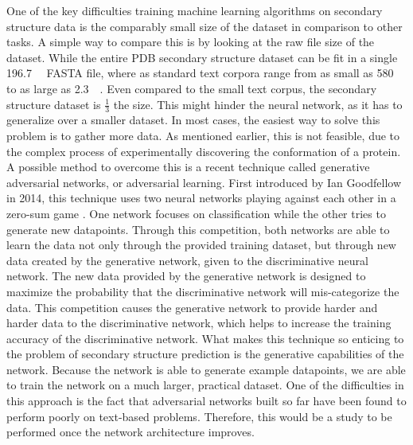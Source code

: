\documentclass[pageno]{jpaper}
\begin{document}
\par
One of the key difficulties training machine learning algorithms on secondary structure data is the comparably small size of the dataset in comparison to other tasks.  A simple way to compare this is by looking at the raw file size of the dataset.  While the entire PDB secondary structure dataset can be fit in a single \SI{196.7}{\mega\byte} FASTA file, where as standard text corpora range from as small as \SI{580}{\mega\byte} to as large as \SI{2.3}{\giga\byte}.  Even compared to the small text corpus, the secondary structure dataset is $\frac{1}{3}$ the size.  This might hinder the neural network, as it has to generalize over a smaller dataset.  In most cases, the easiest way to solve this problem is to gather more data.  As mentioned earlier, this is not feasible, due to the complex process of experimentally discovering the conformation of a protein.  A possible method to overcome this is a recent technique called generative adversarial networks, or adversarial learning.  First introduced by Ian Goodfellow in 2014, this technique uses two neural networks playing against each other in a zero-sum game \cite{goodfellow:2014}.  One network focuses on classification while the other tries to generate new datapoints.  Through this competition, both networks are able to learn the data not only through the provided training dataset, but through new data created by the generative network, given to the discriminative neural network.  The new data provided by the generative network is designed to maximize the probability that the discriminative network will mis-categorize the data.  This competition causes the generative network to provide harder and harder data to the discriminative network, which helps to increase the training accuracy of the discriminative network.  What makes this technique so enticing to the problem of secondary structure prediction is the generative capabilities of the network.  Because the network is able to generate example datapoints, we are able to train the network on a much larger, practical dataset.  One of the difficulties in this approach is the fact that adversarial networks built so far have been found to perform poorly on text-based problems.  Therefore, this would be a study to be performed once the network architecture improves.

\pagebreak
{}


\pagebreak
\end{document}
